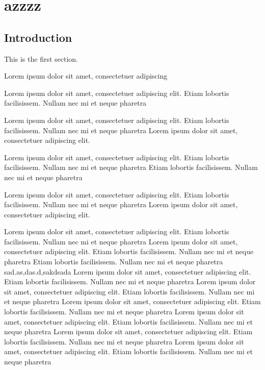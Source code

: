 \documentclass[12pt,oneside,justify]{book}
\begin{document}
 




\tableofcontents

\chapter{azzzz}
\section{Introduction}
 
This is the first section.
 
Lorem  ipsum  dolor  sit  amet,  consectetuer  adipiscing  

 
Lorem ipsum dolor sit amet, consectetuer adipiscing elit.  
Etiam lobortis facilisissem.  Nullam nec mi et neque pharetra  
 
Lorem ipsum dolor sit amet, consectetuer adipiscing elit.  
Etiam lobortis facilisissem.  Nullam nec mi et neque pharetra Lorem ipsum dolor sit amet, consectetuer adipiscing elit.  
 
Lorem ipsum dolor sit amet, consectetuer adipiscing elit.  
Etiam lobortis facilisissem.  Nullam nec mi et neque pharetra Etiam lobortis facilisissem.  Nullam nec mi et neque pharetra  
 
Lorem ipsum dolor sit amet, consectetuer adipiscing elit.  
Etiam lobortis facilisissem.  Nullam nec mi et neque pharetra Lorem ipsum dolor sit amet, consectetuer adipiscing elit.  
 
Lorem ipsum dolor sit amet, consectetuer adipiscing elit.  
Etiam lobortis facilisissem.  Nullam nec mi et neque pharetra  
Lorem ipsum dolor sit amet, consectetuer adipiscing elit.  
Etiam lobortis facilisissem.  Nullam nec mi et neque pharetra Etiam lobortis facilisissem.  Nullam nec mi et neque pharetra 
 sad.as,das.d,sakdsada
Lorem ipsum dolor sit amet, consectetuer adipiscing elit.  
Etiam lobortis facilisissem.  Nullam nec mi et neque pharetra  
Lorem ipsum dolor sit amet, consectetuer adipiscing elit.  
Etiam lobortis facilisissem.  Nullam nec mi et neque pharetra  
Lorem ipsum dolor sit amet, consectetuer adipiscing elit.  
Etiam lobortis facilisissem.  Nullam nec mi et neque pharetra  
Lorem ipsum dolor sit amet, consectetuer adipiscing elit.  
Etiam lobortis facilisissem.  Nullam nec mi et neque pharetra  
Lorem ipsum dolor sit amet, consectetuer adipiscing elit.  
Etiam lobortis facilisissem.  Nullam nec mi et neque pharetra   
Lorem ipsum dolor sit amet, consectetuer adipiscing elit.  
Etiam lobortis facilisissem.  Nullam nec mi et neque pharetra  
 
\end{document}
